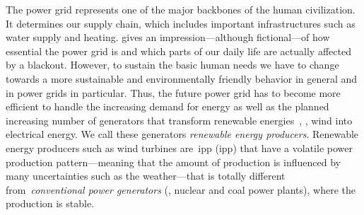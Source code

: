 \label{ch:intro}
\glsresetall
% 
The power grid represents one of the major backbones of the human civilization.
It determines our supply chain, which includes important infrastructures such as
water supply and heating. \textcite{Els17} gives an impression---although
fictional---of how essential the power grid is and which parts of our daily life
are actually affected by a blackout. However, to sustain the basic human needs
we have to change towards a more sustainable and environmentally friendly
behavior in general and in power grids in particular. Thus, the future power
grid has to become more efficient to handle the increasing demand for energy as
well as the planned increasing number of generators that transform renewable
energies~\parencite{online:eeg2014}, \eg, wind into electrical energy. We call
these generators \emph{renewable energy producers}. Renewable energy producers
such as wind turbines are~\acrlong{ipp} (\gls{ipp}) that have a volatile power
production pattern---meaning that the amount of production is influenced by many
uncertainties such as the weather---that is totally different
from~\emph{conventional power generators} (\eg, nuclear and coal power plants),
where the production is stable.

